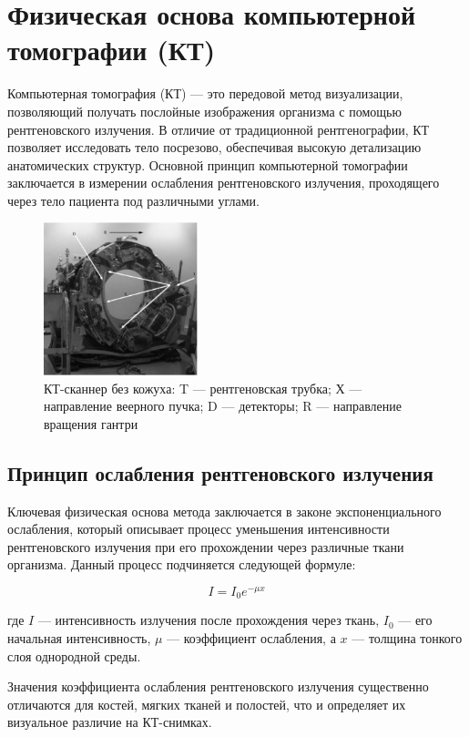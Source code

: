 \section{Физическая основа компьютерной томографии (КТ)}
Компьютерная томография (КТ) — это передовой метод визуализации, позволяющий получать послойные изображения организма с помощью рентгеновского излучения. В отличие от традиционной рентгенографии, КТ позволяет исследовать тело посрезово, обеспечивая высокую детализацию анатомических структур. Основной принцип компьютерной томографии заключается в измерении ослабления рентгеновского излучения, проходящего через тело пациента под различными углами\cite{ktmrt}.
\begin{figure}[H]
    \centering
    \includegraphics[width=0.4\textwidth]{pic/4.png}
    \caption{КТ-сканнер без кожуха: T — рентгеновская трубка; Х — направление веерного пучка; D — детекторы;
    R — направление вращения гантри}
    \label{fig:image1}
\end{figure}
\subsection{Принцип ослабления рентгеновского излучения}
Ключевая физическая основа метода заключается в законе экспоненциального ослабления, который описывает процесс уменьшения интенсивности рентгеновского излучения при его прохождении через различные ткани организма. Данный процесс подчиняется следующей формуле:

\[ I = I_0 e^{-\mu x} \]

где \( I \) — интенсивность излучения после прохождения через ткань, \( I_0 \) — его начальная интенсивность, \( \mu \) — коэффициент ослабления, а \( x \) — толщина тонкого слоя однородной среды. 

Значения коэффициента ослабления рентгеновского излучения существенно отличаются для костей, мягких тканей и полостей, что и определяет их визуальное различие на КТ-снимках\cite{ktmrt}.

